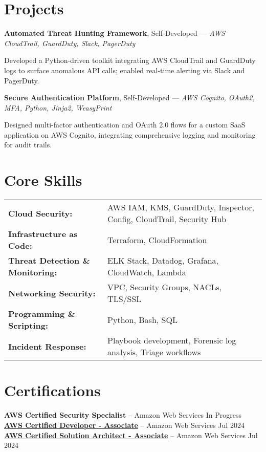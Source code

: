 \documentclass[10pt, letterpaper]{article}
\begin{document}
\vspace{0.04cm}

\section{Projects}

\textbf{\textcolor{myNavy}{Automated Threat Hunting Framework}}, Self-Developed — \textit{\textcolor{myBlue}{AWS CloudTrail, GuardDuty, Slack, PagerDuty}}

Developed a Python-driven toolkit integrating AWS CloudTrail and GuardDuty logs to surface anomalous API calls; enabled real-time alerting via Slack and PagerDuty.

\textbf{\textcolor{myNavy}{Secure Authentication Platform}}, Self-Developed — \textit{\textcolor{myBlue}{AWS Cognito, OAuth2, MFA, Python, Jinja2, WeasyPrint}}

Designed multi-factor authentication and OAuth 2.0 flows for a custom SaaS application on AWS Cognito, integrating comprehensive logging and monitoring for audit trails.


\section{Core Skills}
\begin{tabular}{@{}l l@{}}
\textbf{\textcolor{myNavy}{Cloud Security:}} & AWS IAM, KMS, GuardDuty, Inspector, Config, CloudTrail, Security Hub \\
\textbf{\textcolor{myNavy}{Infrastructure as Code:}} & Terraform, CloudFormation \\
\textbf{\textcolor{myNavy}{Threat Detection \& Monitoring:}} & ELK Stack, Datadog, Grafana, CloudWatch, Lambda \\
\textbf{\textcolor{myNavy}{Networking Security:}} & VPC, Security Groups, NACLs, TLS/SSL \\
\textbf{\textcolor{myNavy}{Programming \& Scripting:}} & Python, Bash, SQL \\
\textbf{\textcolor{myNavy}{Incident Response:}} & Playbook development, Forensic log analysis, Triage workflows
\end{tabular}


\vspace{0.04cm}

\section{Certifications}
\textbf {AWS Certified Security Specialist} -- Amazon Web Services \hfill \textcolor{myDarkGray}{In Progress} \\
\textbf{\href{https://cp.certmetrics.com/amazon/en/public/verify/credential/dc7c20379cf94f2699a4d430c31ac969}{AWS Certified Developer - Associate}} -- Amazon Web Services \hfill \textcolor{myDarkGray}{Jul 2024} \\
\textbf{\href{https://cp.certmetrics.com/amazon/en/public/verify/credential/7ec7fce4db1f4b1bab3b6f8caa3f509b}{AWS Certified Solution Architect - Associate}} -- Amazon Web Services \hfill \textcolor{myDarkGray}{Jul 2024}
\end{document}
